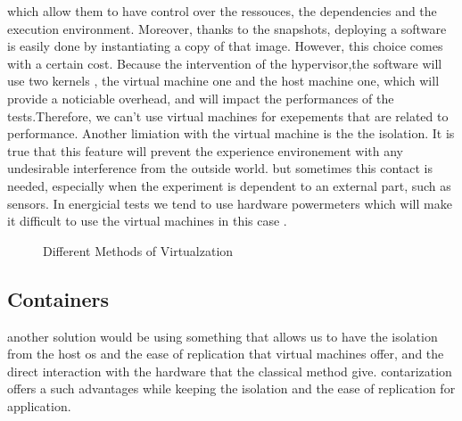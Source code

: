 which allow them to have control over the ressouces, the dependencies and the execution environment. Moreover, thanks to the snapshots, deploying a software is easily done by instantiating a copy of that image.
However, this choice comes with a certain cost. Because the intervention of the hypervisor,the software will use two kernels , the virtual machine one and the host machine one, which will provide a noticiable overhead, and will impact the performances of the tests.Therefore, we can't use virtual machines for exepements that are related to performance. Another limiation with the virtual machine is the the isolation. It is true that this feature will prevent the experience environement with any undesirable interference from the outside world. but sometimes this contact is needed, especially when the experiment is dependent to an external part, such as sensors. In energicial tests we tend to use hardware powermeters which will make it difficult to use the virtual machines in this case .


\begin{figure}
    \caption{Different Methods of Virtualzation}\label{environement:virtualization_technique}
\end{figure}

\subsection{Containers}

another solution would be using something that allows us to have the isolation from the host os and the ease of replication that virtual machines offer, and the direct interaction with the hardware that the classical method give.
contarization offers a such advantages while keeping the isolation and the ease of replication for application.

